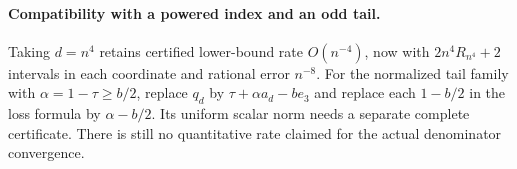 \paragraph{Compatibility with a powered index and an odd tail.}
Taking $d=n^4$ retains certified lower-bound rate $O(n^{-4})$, now
with $2n^4R_{n^4}+2$ intervals in each coordinate and rational error
$n^{-8}$.  For the normalized tail family with
$\alpha=1-\tau\geq b/2$, replace $q_d$ by
$\tau+\alpha a_d-be_3$ and replace each $1-b/2$ in the loss formula
by $\alpha-b/2$.  Its uniform scalar norm needs a separate complete
certificate.  There is still no quantitative rate claimed for the
actual denominator convergence.
